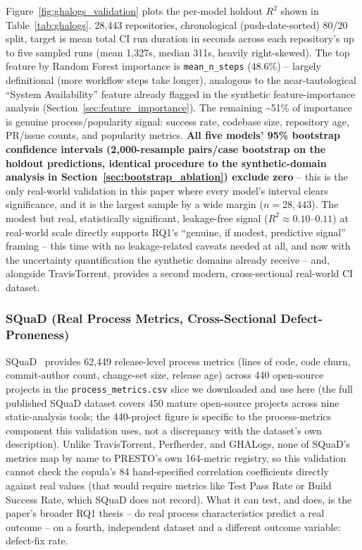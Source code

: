 \documentclass[technologies,article,submit,pdftex,moreauthors]{Definitions/mdpi}
\begin{document}
Figure~\ref{fig:ghalogs_validation} plots the per-model holdout \(R^2\) shown in Table~\ref{tab:ghalogs}.
28,443 repositories, chronological (push-date-sorted) 80/20 split,
target is mean total CI run duration in seconds across each repository's
up to five sampled runs (mean 1,327s, median 311s, heavily
right-skewed). The top feature by Random Forest importance is
\texttt{mean\_n\_steps} (48.6\%) -- largely definitional (more workflow
steps take longer), analogous to the near-tautological ``System
Availability'' feature already flagged in the synthetic
feature-importance analysis (Section~\ref{sec:feature_importance}). The remaining
\textasciitilde51\% of importance is genuine process/popularity signal:
success rate, codebase size, repository age, PR/issue counts, and
popularity metrics. \textbf{All five models' 95\% bootstrap confidence
intervals (2,000-resample pairs/case bootstrap on the holdout
predictions, identical procedure to the synthetic-domain analysis in
Section~\ref{sec:bootstrap_ablation}) exclude zero} -- this is the only
real-world validation in this paper where every model's interval
clears significance, and it is the largest sample by a wide margin
(\(n=28{,}443\)). The modest but real, statistically significant, leakage-free
signal (\(R^2 \approx 0.10\)--\(0.11\)) at real-world scale directly
supports RQ1's ``genuine, if modest, predictive signal'' framing -- this
time with no leakage-related caveats needed at all, and now with the
uncertainty quantification the synthetic domains already receive -- and, alongside
TravisTorrent, provides a second modern, cross-sectional real-world CI
dataset.

\subsubsection{SQuaD (Real Process Metrics, Cross-Sectional
Defect-Proneness)}\label{sec:squad}

SQuaD~\cite{squad2025} provides 62,449 release-level process metrics (lines of
code, code churn, commit-author count, change-set size, release age)
across 440 open-source projects in the \texttt{process\_metrics.csv} slice we
downloaded and use here (the full published SQuaD dataset covers 450
mature open-source projects across nine static-analysis tools; the
440-project figure is specific to the process-metrics component this
validation uses, not a discrepancy with the dataset's own description).
Unlike TravisTorrent, Perfherder, and
GHALogs, none of SQuaD's metrics map by name to PRESTO's own 164-metric
registry, so this validation cannot check the copula's 84 hand-specified
correlation coefficients directly against real values (that would
require metrics like Test Pass Rate or Build Success Rate, which SQuaD
does not record). What it can test, and does, is the paper's broader RQ1
thesis -- do real process characteristics predict a real outcome -- on a
fourth, independent dataset and a different outcome variable: defect-fix
rate.
\end{document}
